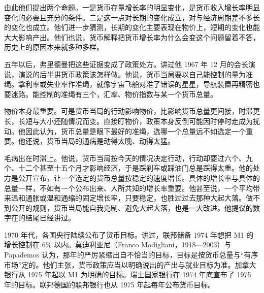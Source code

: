 由此他们提出两个命题\cite{friedmanschwartz1963}。一是货币存量增长率的明显变化，是货币收入增长率明显变化的必要且充分的条件。二是这一点对长期的变化成立，对与经济周期差不多长的变化也成立\cite{friedmanschwartz1963}。他们进一步猜测，长期的变化主要表现在物价上，短期的变化也能大大影响产出\cite{friedmanschwartz1963}。他们也说，货币解释把货币增长率为什么会变这个问题留着不答，历史上的原因本来就多种多样\cite{friedmanschwartz1963}。

五年以后，弗里德曼把这些证据变成了政策处方。讲过他 1967 年 12 月的会长演说，演说的后半讲货币政策该怎样做\cite{friedman1968}。他说，货币当局要以自己能控制的量为准绳\cite{friedman1968}。拿利率或失业率作准绳，就像宇宙飞船对准了错误的星星，导航装置再精密也要迷路\cite{friedman1968}。能控制的准绳有三个，汇率、物价指数与某一个货币总量\cite{friedman1968}。

物价本身最重要。可是货币当局的行动影响物价，比影响货币总量更间接，时滞更长，长短与大小还随情况而变\cite{friedman1968}。直接盯物价，政策本身反倒可能因时停时走成为扰动\cite{friedman1968}。他因此认为，货币总量是眼下最好的准绳，选哪一个总量远不如选定一个重要\cite{friedman1968}。他还说，货币当局的通病是动得太晚、动得太猛\cite{friedman1968}。

毛病出在时滞上。他说，货币当局按今天的情况决定行动，行动却要过六个、九个、十二个甚至十五个月才影响经济，于是踩刹车或踩油门总是踩得太重\cite{friedman1968}。他的处方是公开宣布，让一个选定的货币总量按稳定的速度增长\cite{friedman1968}。具体的增长率与具体的总量一样，不如有一个公布出来、人所共知的增长率重要\cite{friedman1968}。他甚至说，一个平均带来温和通胀或温和通缩的固定增长率，只要稳定，也胜过过去那种大起大落\cite{friedman1968}。做不到公开的规则，货币当局能自我克制、避免大起大落，也是一大改进\cite{friedman1968}。他提议的数字在的结尾已经讲过。

1970 年代，各国央行陆续公布了货币目标。讲过，联邦储备 1974 年想把 M1 的增长控制在 6\% 以内。莫迪利亚尼（Franco Modigliani，1918—2003）与 Papademos 认为，那年的严厉紧缩出自不恰当的目标，目标是按货币总量与“有序市场”定的\cite{modigliani1975,loc45}。他们主张，货币政策应当以明确说出的产出与就业目标为准\cite{modigliani1975}。加拿大银行从 1975 年起以 M1 为明确的目标\cite{bouey1982a}。瑞士国家银行在 1974 年底宣布了 1975 年的目标\cite{rich2003}。联邦德国的联邦银行也从 1975 年起每年公布货币目标\cite{gerberding2004}。

